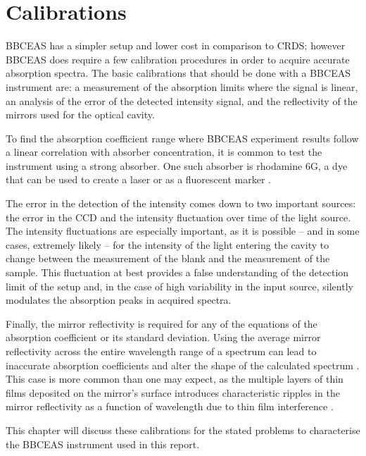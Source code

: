 \chapter{Calibrations}\label{ch:cal}

\acl{BBCEAS} has a simpler setup and lower cost in comparison to \ac{CRDS};
however \ac{BBCEAS} does require a few calibration procedures in order to
acquire accurate absorption spectra. The basic calibrations that should be
done with a \ac{BBCEAS} instrument are: a measurement of the absorption limits
where the signal is linear, an analysis of the error of the detected intensity
signal, and the reflectivity of the mirrors used for the optical cavity.

To find the absorption coefficient range where \ac{BBCEAS} experiment results
follow a linear correlation with absorber concentration, it is common to test
the instrument using a strong absorber. One such absorber is rhodamine 6G,
a dye that can be used to create a laser \cite{Pappalardo:1970hi} or as a
fluorescent marker \cite{Gear:1974tf}.

The error in the detection of the intensity comes down to two important
sources: the error in the \ac{CCD} and the intensity fluctuation over time of
the light source. The intensity fluctuations are especially important, as it
is possible -- and in some cases, extremely likely -- for the intensity of
the light entering the cavity to change between the measurement of the blank
and the measurement of the sample. This fluctuation at best provides a false
understanding of the detection limit of the setup and, in the case of high
variability in the input source, silently modulates the absorption peaks in
acquired spectra.

Finally, the mirror reflectivity is required for any of the equations of the
absorption coefficient or its standard deviation. Using the average mirror
reflectivity across the entire wavelength range of a spectrum can lead to
inaccurate absorption coefficients and alter the shape of the calculated
spectrum \cite{Berden:2009wk}. This case is more common than one may expect,
as the multiple layers of thin films deposited on the mirror's surface
introduces characteristic ripples in the mirror reflectivity as a function of
wavelength due to thin film interference \cite{Islam:2007ea}.

This chapter will discuss these calibrations for the stated problems to
characterise the \ac{BBCEAS} instrument used in this report.



